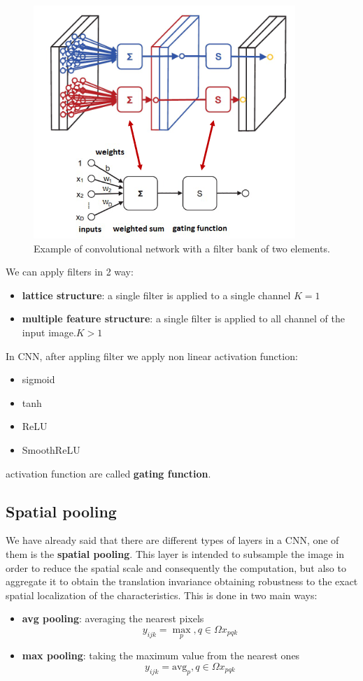 \begin{figure}[!ht]
    \centering
    \includegraphics[width=0.5\linewidth]{img/CNN/Conv2Filter.png}
    \caption{Example of convolutional network with a filter bank of two elements.}
    \label{fig:conv2filter}
\end{figure}

We can apply filters in 2 way:
\begin{itemize}
    \item \textbf{lattice structure}: a single filter is applied to a single channel  $K=1$
    \item \textbf{multiple feature structure}: a single filter is applied to all 
    channel of the input image.$K>1$
\end{itemize}

In CNN, after appling filter we apply non linear activation function:
\begin{itemize}
    \item sigmoid
    \item tanh
    \item ReLU
    \item SmoothReLU
\end{itemize}  
activation function are called \textbf{gating function}.

\subsection{Spatial pooling}
We have already said that there are different types of layers in a CNN, one of them is 
the \textbf{spatial pooling}. This layer is intended to subsample the image in order 
to reduce the spatial scale and consequently the computation, but also to aggregate 
it to obtain the translation invariance obtaining robustness to the exact spatial 
localization of the characteristics. This is done in two main ways: 
\begin{itemize}
    \item \textbf{avg pooling}: averaging the nearest 
    pixels
    $$y_{ijk} =\max \limits_p,q\in \Omega x_{pqk}$$
    \item \textbf{max pooling}: taking the maximum value from the nearest ones
    $$y_{ijk} =\text{avg}_p,q\in \Omega x_{pqk}$$
\end{itemize}

